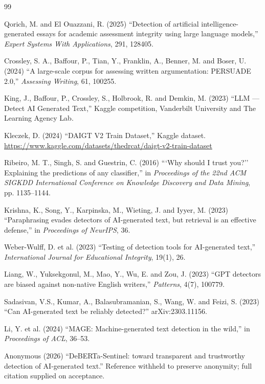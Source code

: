\documentclass{article}
\begin{document}
\begin{thebibliography}{99}
\small

 Qorich, M. and El Ouazzani, R. (2025) ``Detection of
artificial intelligence-generated essays for academic assessment integrity
using large language models,'' \emph{Expert Systems With Applications},
291, 128405.

 Crossley, S. A., Baffour, P., Tian, Y., Franklin,
A., Benner, M. and Boser, U. (2024) ``A large-scale corpus for assessing
written argumentation: PERSUADE 2.0,'' \emph{Assessing Writing}, 61,
100255.

 King, J., Baffour, P., Crossley, S., Holbrook, R. and
Demkin, M. (2023) ``LLM --- Detect AI Generated Text,'' Kaggle competition,
Vanderbilt University and The Learning Agency Lab.

 Kleczek, D. (2024) ``DAIGT V2 Train Dataset,'' Kaggle
dataset.
\url{https://www.kaggle.com/datasets/thedrcat/daigt-v2-train-dataset}

 Ribeiro, M. T., Singh, S. and Guestrin, C. (2016)
```Why should I trust you?'' Explaining the predictions of any classifier,''
in \emph{Proceedings of the 22nd ACM SIGKDD International Conference on
Knowledge Discovery and Data Mining}, pp. 1135--1144.

 Krishna, K., Song, Y., Karpinska, M., Wieting, J. and
Iyyer, M. (2023) ``Paraphrasing evades detectors of AI-generated text, but
retrieval is an effective defense,'' in \emph{Proceedings of NeurIPS}, 36.

 Weber-Wulff, D. et al. (2023) ``Testing of
detection tools for AI-generated text,'' \emph{International Journal for
Educational Integrity}, 19(1), 26.

 Liang, W., Yuksekgonul, M., Mao, Y., Wu, E. and Zou, J.
(2023) ``GPT detectors are biased against non-native English writers,''
\emph{Patterns}, 4(7), 100779.

 Sadasivan, V.S., Kumar, A., Balasubramanian, S.,
Wang, W. and Feizi, S. (2023) ``Can AI-generated text be reliably
detected?'' arXiv:2303.11156.

 Li, Y. et al. (2024) ``MAGE: Machine-generated text
detection in the wild,'' in \emph{Proceedings of ACL}, 36--53.

 Anonymous (2026) ``DeBERTa-Sentinel: toward
transparent and trustworthy detection of AI-generated text.'' Reference
withheld to preserve anonymity; full citation supplied on acceptance.


\end{thebibliography}
\end{document}
